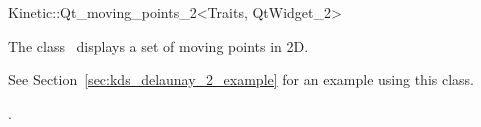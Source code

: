 

\begin{ccRefClass}{Kinetic::Qt_moving_points_2<Traits, QtWidget_2>}  %


\ccDefinition
  
The class \ccRefName\ displays a set of moving points in 2D.

See Section~\ref{sec:kds_delaunay_2_example} for an example using this class. 





\ccCreation
{}  %



\ccSeeAlso

.

\end{ccRefClass}


